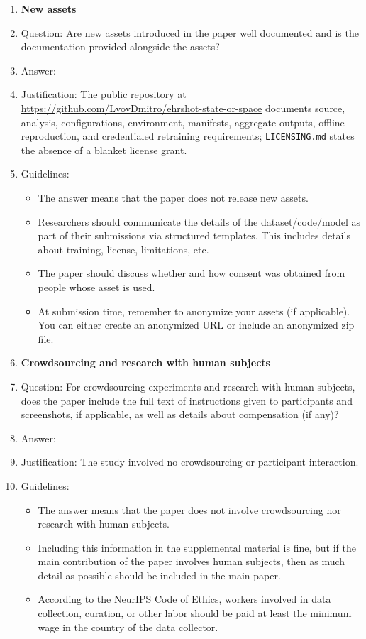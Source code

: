 \documentclass{article}
\begin{document}
\begin{enumerate}
\item {\bf New assets}
    \item[] Question: Are new assets introduced in the paper well documented and is the documentation provided alongside the assets?
    \item[] Answer: \answerYes{}
    \item[] Justification: The public repository at \url{https://github.com/LvovDmitro/ehrshot-state-or-space} documents source, analysis, configurations, environment, manifests, aggregate outputs, offline reproduction, and credentialed retraining requirements; \texttt{LICENSING.md} states the absence of a blanket license grant.
    \item[] Guidelines:
    \begin{itemize}
        \item The answer \answerNA{} means that the paper does not release new assets.
        \item Researchers should communicate the details of the dataset\slash code\slash model as part of their submissions via structured templates. This includes details about training, license, limitations, etc. 
        \item The paper should discuss whether and how consent was obtained from people whose asset is used.
        \item At submission time, remember to anonymize your assets (if applicable). You can either create an anonymized URL or include an anonymized zip file.
    \end{itemize}

\item {\bf Crowdsourcing and research with human subjects}
    \item[] Question: For crowdsourcing experiments and research with human subjects, does the paper include the full text of instructions given to participants and screenshots, if applicable, as well as details about compensation (if any)? 
    \item[] Answer: \answerNA{}
    \item[] Justification: The study involved no crowdsourcing or participant interaction.
    \item[] Guidelines:
    \begin{itemize}
        \item The answer \answerNA{} means that the paper does not involve crowdsourcing nor research with human subjects.
        \item Including this information in the supplemental material is fine, but if the main contribution of the paper involves human subjects, then as much detail as possible should be included in the main paper. 
        \item According to the NeurIPS Code of Ethics, workers involved in data collection, curation, or other labor should be paid at least the minimum wage in the country of the data collector. 
    \end{itemize}


\end{enumerate}
\end{document}
